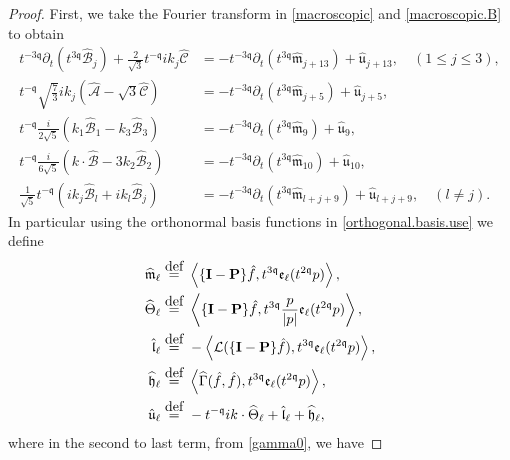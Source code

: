 \documentclass[10pt,a4paper]{amsart}
\newcommand{\eqdef }{\overset{\mbox{\tiny{def}}}{=}}
\newcommand{\highG}{\Theta}
\newcommand{\irnp}[2]{\left\langle {#1},{#2} \right\rangle}
\newcommand{\linL}{\mathcal{L}}
\newcommand{\micro}{{\bf \{I- P\}}}
\newcommand{\pv}{p}
\newcommand{\qq}{\mathfrak{q}}
\newcommand{\tTq}{t^{3\qq}}
\newcommand{\tmTq}{t^{-3\qq}}
\newcommand{\tmq}{t^{-\qq}}
\newcommand{\tqq}{t^{2\qq}}
\begin{document}
\begin{proof}
First, we take the Fourier transform in \eqref{macroscopic} and \eqref{macroscopic.B} to obtain 
\begin{align} \label{macroscopic.FT.B}
 \tmTq\partial_t \left(\tTq \widehat{\mathcal{B}}_j \right) 
 +
\frac{2}{\sqrt{3}}\tmq ik_j  \widehat{\mathcal{C}} 
&=
-\tmTq  \partial_t\left( \tTq \widehat{\mathfrak{m}}_{j+13} \right)+\hat{\mathfrak{u}}_{j+13} , \quad (1 \leq j \leq 3),
\\ 
\label{macroscopic.FT.AC}
\tmq\sqrt{\frac{7}{3}}ik_j \left(\widehat{\mathcal{A}}
-
\sqrt{3}\widehat{\mathcal{C}} \right)
&=-\tmTq  \partial_t\left( \tTq \widehat{\mathfrak{m}}_{j+5} \right)+\hat{\mathfrak{u}}_{j+5},
\\ \label{macroscopic.FT.Bthree}
\tmq\frac{i}{2\sqrt{5}} \left( k_1 \widehat{\mathcal{B}}_1 - k_3 \widehat{\mathcal{B}}_3\right)
&=-\tmTq  \partial_t\left( \tTq \widehat{\mathfrak{m}}_{9} \right)+\widehat{\mathfrak{u}}_{9},
 \\ \label{macroscopic.FT.Btwo}
\tmq\frac{i}{6\sqrt{5}}\left( k\cdot \widehat{\mathcal{B}}-3k_2 \widehat{\mathcal{B}}_2\right)
&=-\tmTq  \partial_t\left( \tTq \widehat{\mathfrak{m}}_{10} \right)+\widehat{\mathfrak{u}}_{10},
 \\ \label{macroscopic.FT.Bjl}
\frac{1}{\sqrt{5}}  \tmq\left(ik_j \widehat{\mathcal{B}}_l+ik_l \widehat{\mathcal{B}}_j \right)
&=-\tmTq  \partial_t\left( \tTq \widehat{\mathfrak{m}}_{l+j+9} \right)+\hat{\mathfrak{u}}_{l+j+9},
\quad (l\neq j).
\end{align}
In particular using the orthonormal basis functions in \eqref{orthogonal.basis.use} we define
\begin{align} \notag
\widehat{\mathfrak{m}}_{\ell} \eqdef &~  \irnp{  \micro \hat{f}}{\tTq \mathfrak{e}_{\ell}(\tqq \pv)},
\\ \label{rhs.def.terms.FT}
\widehat{\highG}_{\ell} \eqdef &~  \irnp{\micro \hat{f}}{\tTq \frac{\pv}{| \pv|}\mathfrak{e}_{\ell}(\tqq \pv)},
\\ \notag
\hat{\mathfrak{l}}_{\ell} \eqdef &~  -\irnp{\linL(\micro \hat{f})}{\tTq \mathfrak{e}_{\ell}(\tqq \pv)},
\\ \notag
\widehat{\mathfrak{h}}_{\ell}  \eqdef &~ 
\irnp{\widehat{\Gamma}(\hat{f},\hat{f})}{\tTq \mathfrak{e}_{\ell}(\tqq \pv)},
 \\ \notag
\hat{\mathfrak{u}}_{\ell} \eqdef &~  -\tmq ik \cdot \widehat{\highG}_{\ell}
 +\hat{\mathfrak{l}}_{\ell}+\widehat{\mathfrak{h}}_{\ell},
\end{align}
where in the second to last term, from \eqref{gamma0}, we have

\end{proof}
\end{document}
